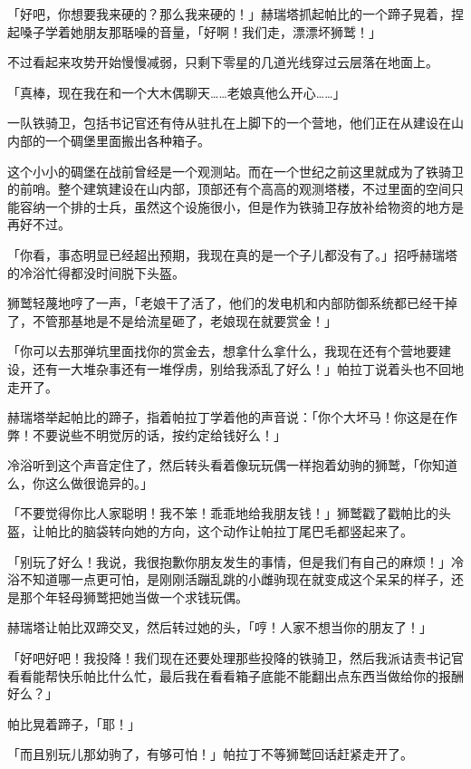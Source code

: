 「好吧，你想要我来硬的？那么我来硬的！」赫瑞塔抓起帕比的一个蹄子晃着，捏起嗓子学着她朋友那聒噪的音量，「好啊！我们走，漂漂坏狮鹫！」

不过看起来攻势开始慢慢减弱，只剩下零星的几道光线穿过云层落在地面上。

「真棒，现在我在和一个大木偶聊天……老娘真他么开心……」

\horizonline


一队铁骑卫，包括书记官还有侍从驻扎在上脚下的一个营地，他们正在从建设在山内部的一个碉堡里面搬出各种箱子。

这个小小的碉堡在战前曾经是一个观测站。而在一个世纪之前这里就成为了铁骑卫的前哨。整个建筑建设在山内部，顶部还有个高高的观测塔楼，不过里面的空间只能容纳一个排的士兵，虽然这个设施很小，但是作为铁骑卫存放补给物资的地方是再好不过。

「你看，事态明显已经超出预期，我现在真的是一个子儿都没有了。」招呼赫瑞塔的冷浴忙得都没时间脱下头盔。

狮鹫轻蔑地哼了一声，「老娘干了活了，他们的发电机和内部防御系统都已经干掉了，不管那基地是不是给流星砸了，老娘现在就要赏金！」

「你可以去那弹坑里面找你的赏金去，想拿什么拿什么，我现在还有个营地要建设，还有一大堆杂事还有一堆俘虏，别给我添乱了好么！」帕拉丁说着头也不回地走开了。

赫瑞塔举起帕比的蹄子，指着帕拉丁学着他的声音说：「你个大坏马！你这是在作弊！不要说些不明觉厉的话，按约定给钱好么！」

冷浴听到这个声音定住了，然后转头看着像玩玩偶一样抱着幼驹的狮鹫，「你知道么，你这么做很诡异的。」

「不要觉得你比人家聪明！我不笨！乖乖地给我朋友钱！」狮鹫戳了戳帕比的头盔，让帕比的脑袋转向她的方向，这个动作让帕拉丁尾巴毛都竖起来了。

「别玩了好么！我说，我很抱歉你朋友发生的事情，但是我们有自己的麻烦！」冷浴不知道哪一点更可怕，是刚刚活蹦乱跳的小雌驹现在就变成这个呆呆的样子，还是那个年轻母狮鹫把她当做一个求钱玩偶。

赫瑞塔让帕比双蹄交叉，然后转过她的头，「哼！人家不想当你的朋友了！」

「好吧好吧！我投降！我们现在还要处理那些投降的铁骑卫，然后我派诘责书记官看看能帮快乐帕比什么忙，最后我在看看箱子底能不能翻出点东西当做给你的报酬好么？」

帕比晃着蹄子，「耶！」

「而且别玩儿那幼驹了，有够可怕！」帕拉丁不等狮鹫回话赶紧走开了。

